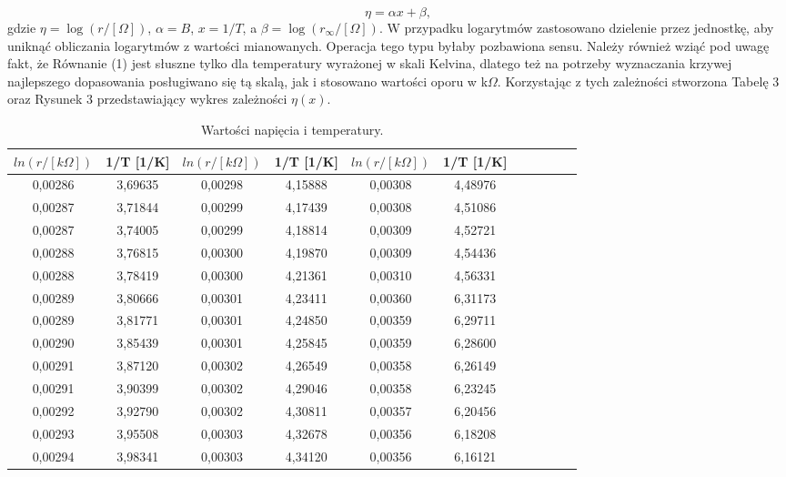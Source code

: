 \documentclass[10pt,a4paper]{article}
\begin{document}
\begin{equation}
\eta=\alpha x+\beta,
\end{equation}
gdzie $\eta=\log{\left(r/[\Omega]\right)}$, $\alpha=B$, $x=1/T$, a $\beta=\log{\left(r_{\infty}/[\Omega]\right)}$. W przypadku logarytmów zastosowano dzielenie przez jednostkę, aby uniknąć obliczania logarytmów z wartości mianowanych. Operacja tego typu byłaby pozbawiona sensu. Należy również wziąć pod uwagę fakt, że Równanie (1) jest słuszne tylko dla temperatury wyrażonej w skali Kelvina, dlatego też na potrzeby wyznaczania krzywej najlepszego dopasowania posługiwano się tą skalą, jak i stosowano wartości oporu w k$\Omega$. Korzystając z tych zależności stworzona Tabelę 3 oraz Rysunek 3 przedstawiający wykres zależności $\eta(x)$. 

\begin{center}
 \begin{table}[h!]
 \centering
 \caption{Wartości napięcia i temperatury.}
 \begin{tabular}{|c|c|c|c|c|c|c|c|c|c|c|}
 \hline
 $ln{(r/[k\Omega])}$ & 1/T [1/K]&$ln{(r/[k\Omega])}$ & 1/T [1/K]&$ln{(r/[k\Omega])}$ & 1/T [1/K]\\
 \hline
0,00286 & 3,69635 & 0,00298 & 4,15888 & 0,00308 & 4,48976 \\ \hline
0,00287 & 3,71844 & 0,00299 & 4,17439 & 0,00308 & 4,51086 \\ \hline
0,00287 & 3,74005 & 0,00299 & 4,18814 & 0,00309 & 4,52721 \\ \hline
0,00288 & 3,76815 & 0,00300 & 4,19870 & 0,00309 & 4,54436 \\ \hline
0,00288 & 3,78419 & 0,00300 & 4,21361 & 0,00310 & 4,56331 \\ \hline
0,00289 & 3,80666 & 0,00301 & 4,23411 & 0,00360 & 6,31173 \\ \hline
0,00289 & 3,81771 & 0,00301 & 4,24850 & 0,00359 & 6,29711 \\ \hline
0,00290 & 3,85439 & 0,00301 & 4,25845 & 0,00359 & 6,28600 \\ \hline
0,00291 & 3,87120 & 0,00302 & 4,26549 & 0,00358 & 6,26149 \\ \hline
0,00291 & 3,90399 & 0,00302 & 4,29046 & 0,00358 & 6,23245 \\ \hline
0,00292 & 3,92790 & 0,00302 & 4,30811 & 0,00357 & 6,20456 \\ \hline
0,00293 & 3,95508 & 0,00303 & 4,32678 & 0,00356 & 6,18208 \\ \hline
0,00294 & 3,98341 & 0,00303 & 4,34120 & 0,00356 & 6,16121 \\ \hline

\end{tabular}
\end{table}
\end{center}
\end{document}
